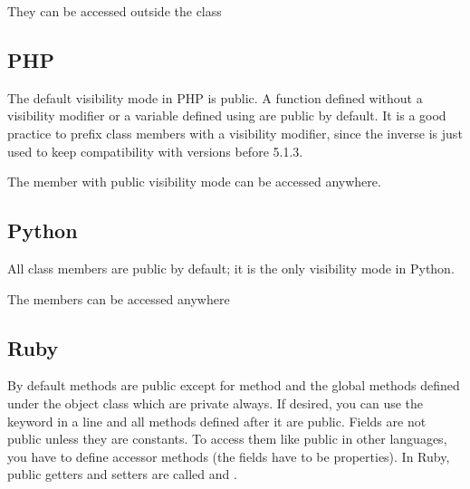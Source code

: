 \documentclass{KodeBook}
\begin{document}


They can be accessed outside the class



\subsection{PHP}

The default visibility mode in PHP is public.
A function defined without a visibility modifier or a variable defined using  are public by default. 
It is a good practice to prefix class members with a visibility modifier, since the inverse is just used to keep compatibility with versions before 5.1.3.



The member with public visibility mode can be accessed anywhere.



\subsection{Python}

All class members are public by default; it is the only visibility mode in Python. 



The members can be accessed anywhere


\subsection{Ruby}

By default methods are public except for  method and the global methods defined under the object class which are private always. 
If desired, you can use the keyword  in a line and all methods defined after it are public. 
Fields are not public unless they are constants. 
To access them like public in other languages, you have to define accessor methods (the fields have to be properties).
In Ruby, public getters and setters are called  and .
\end{document}
